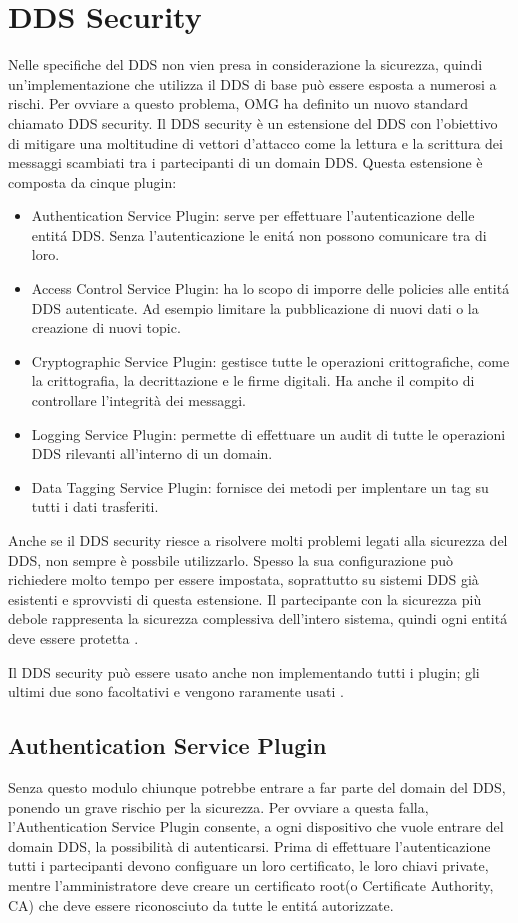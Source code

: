 \section{DDS Security}
Nelle specifiche del DDS non vien presa in considerazione la sicurezza, quindi
un'implementazione che utilizza il DDS di base può essere esposta a numerosi a 
rischi. Per ovviare a questo problema, OMG ha definito un nuovo standard 
chiamato DDS security. Il DDS security è un estensione del DDS con 
l'obiettivo di mitigare una moltitudine di vettori d'attacco come 
la lettura e la scrittura dei messaggi scambiati tra i partecipanti di un 
domain DDS. Questa estensione è composta da cinque plugin:
\begin{itemize}
    \item Authentication Service Plugin: serve per effettuare l'autenticazione 
    delle entitá DDS. Senza l'autenticazione le enitá non possono
    comunicare tra di loro.
    \item Access Control Service Plugin: ha lo scopo di imporre 
    delle policies alle entitá DDS autenticate. Ad esempio limitare
    la pubblicazione di nuovi dati o la creazione di nuovi topic.
    \item Cryptographic Service Plugin: gestisce tutte le operazioni 
    crittografiche, come la crittografia, la decrittazione e
    le firme digitali. Ha anche il compito di controllare l'integrità
    dei messaggi.
    \item Logging Service Plugin: permette di effettuare un audit di 
    tutte le operazioni DDS rilevanti all'interno di un domain.
    \item Data Tagging Service Plugin: fornisce dei metodi per implentare
    un tag su tutti i dati trasferiti. 
\end{itemize}
Anche se il DDS security riesce a risolvere molti problemi legati alla
sicurezza del DDS, non sempre è possbile utilizzarlo. Spesso 
la sua configurazione può richiedere molto tempo per essere 
impostata, soprattutto su sistemi DDS già esistenti e sprovvisti di 
questa estensione.
Il partecipante con la sicurezza più debole rappresenta la sicurezza
complessiva dell'intero sistema, quindi ogni entitá deve essere
protetta \cite{Michaud2017Apr}. 

Il DDS security può essere usato anche non implementando tutti i plugin;
gli ultimi due sono facoltativi e vengono raramente usati \cite{essay93639}. 


\subsection{Authentication Service Plugin}
Senza questo modulo chiunque potrebbe entrare a far parte del domain
del DDS, ponendo un grave rischio per la sicurezza. Per ovviare a questa
falla, l'Authentication Service Plugin consente, a ogni dispositivo che 
vuole entrare del domain DDS, la possibilità di autenticarsi.
Prima di effettuare l'autenticazione tutti i partecipanti devono 
configuare un loro certificato, le loro chiavi private, mentre 
l'amministratore deve creare un certificato root(o Certificate Authority, CA) 
che deve essere riconosciuto da tutte le entitá autorizzate. 

